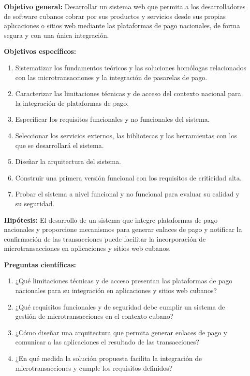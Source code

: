 \documentclass[12pt]{article}
\begin{document}
\textbf{Objetivo general:} Desarrollar un sistema web que permita a los desarrolladores de software cubanos cobrar por sus productos y servicios desde sus propias aplicaciones o sitios web mediante las plataformas de pago nacionales, de forma segura y con una única integración.

\textbf{Objetivos específicos:}
\begin{enumerate}[parsep=5.7bp]
  \item Sistematizar los fundamentos teóricos y las soluciones homólogas relacionados con las microtransacciones y la integración de pasarelas de pago.
  \item Caracterizar las limitaciones técnicas y de acceso del contexto nacional para la integración de plataformas de pago.
  \item Especificar los requisitos funcionales y no funcionales del sistema.
  \item Seleccionar los servicios externos, las bibliotecas y las herramientas con los que se desarrollará el sistema.
  \item Diseñar la arquitectura del sistema.
  \item Construir una primera versión funcional con los requisitos de criticidad alta.
  \item Probar el sistema a nivel funcional y no funcional para evaluar su calidad y su seguridad.
\end{enumerate}

\textbf{Hipótesis:} El desarrollo de un sistema que integre plataformas de pago nacionales y proporcione mecanismos para generar enlaces de pago y notificar la confirmación de las transacciones puede facilitar la incorporación de microtransacciones en aplicaciones y sitios web cubanos.

\textbf{Preguntas científicas:}
\begin{enumerate}[parsep=5.7bp]
  \item ¿Qué limitaciones técnicas y de acceso presentan las plataformas de pago nacionales para su integración en aplicaciones y sitios web cubanos?
  \item ¿Qué requisitos funcionales y de seguridad debe cumplir un sistema de gestión de microtransacciones en el contexto cubano?
  \item ¿Cómo diseñar una arquitectura que permita generar enlaces de pago y comunicar a las aplicaciones el resultado de las transacciones?
  \item ¿En qué medida la solución propuesta facilita la integración de microtransacciones y cumple los requisitos definidos?
\end{enumerate}
\end{document}
